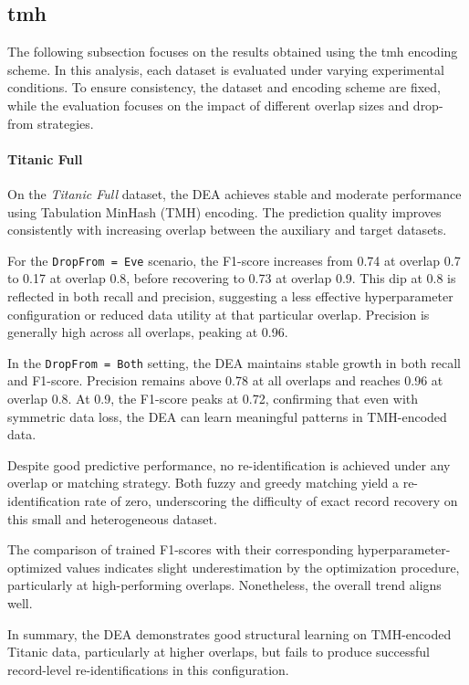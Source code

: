 \subsection{\ac{tmh}}

The following subsection focuses on the results obtained using the \ac{tmh} encoding scheme.
In this analysis, each dataset is evaluated under varying experimental conditions.
To ensure consistency, the dataset and encoding scheme are fixed, while the evaluation focuses on the impact of different overlap sizes and drop-from strategies.


\paragraph{Titanic Full}

On the \textit{Titanic Full} dataset, the DEA achieves stable and moderate performance using Tabulation MinHash (TMH) encoding. The prediction quality improves consistently with increasing overlap between the auxiliary and target datasets.

For the \texttt{DropFrom = Eve} scenario, the F1-score increases from 0.74 at overlap 0.7 to 0.17 at overlap 0.8, before recovering to 0.73 at overlap 0.9. This dip at 0.8 is reflected in both recall and precision, suggesting a less effective hyperparameter configuration or reduced data utility at that particular overlap. Precision is generally high across all overlaps, peaking at 0.96.

In the \texttt{DropFrom = Both} setting, the DEA maintains stable growth in both recall and F1-score. Precision remains above 0.78 at all overlaps and reaches 0.96 at overlap 0.8. At 0.9, the F1-score peaks at 0.72, confirming that even with symmetric data loss, the DEA can learn meaningful patterns in TMH-encoded data.

Despite good predictive performance, no re-identification is achieved under any overlap or matching strategy. Both fuzzy and greedy matching yield a re-identification rate of zero, underscoring the difficulty of exact record recovery on this small and heterogeneous dataset.

The comparison of trained F1-scores with their corresponding hyperparameter-optimized values indicates slight underestimation by the optimization procedure, particularly at high-performing overlaps. Nonetheless, the overall trend aligns well.

In summary, the DEA demonstrates good structural learning on TMH-encoded Titanic data, particularly at higher overlaps, but fails to produce successful record-level re-identifications in this configuration.




